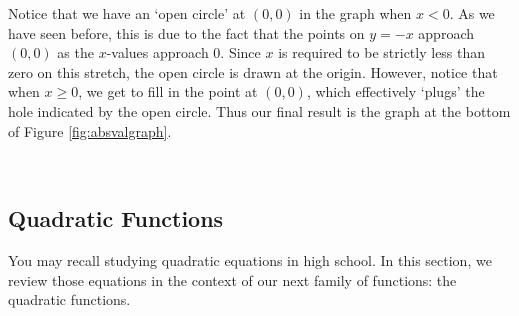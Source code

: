 {Notice that we have an `open circle' at $(0,0)$ in the graph when $x<0$. As we have seen before, this is due to the fact that the points on $y = -x$ approach $(0,0)$ as the $x$-values approach $0$.  Since $x$ is required to be strictly less than zero on this stretch, the open circle is drawn at the origin.  However, notice that when $x \geq 0$, we get to fill in the point at $(0,0)$, which effectively `plugs' the hole indicated by the open circle.  Thus our final result is the graph at the bottom of Figure \ref{fig:absvalgraph}.



}\\




\newpage

\subsection{Quadratic Functions}
\label{QuadraticFunctions}

You may recall studying quadratic equations in high school.  In this section, we review those equations in the context of our next family of functions: the quadratic functions.

\smallskip


\smallskip

